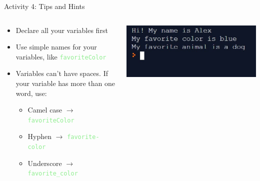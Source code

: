 \documentclass[hyperref={pdfpagemode=FullScreen},aspectratio=169]{beamer}
\begin{document}
  \begin{frame}{Activity 4: Tips and Hints}

    \begin{columns}[c]
      \begin{column}{0.48\textwidth}
        {\small \begin{itemize}
          \item Declare all your variables first
          \item Use simple names for your variables, like \textcolor{lightGreen}{\texttt{favoriteColor}}
          \item Variables can't have spaces. If your variable has more than one word, use:
        
            \begin{itemize}
              \item Camel case $\rightarrow$ \textcolor{lightGreen}{\texttt{favoriteColor}}
              \item Hyphen $\rightarrow$ \textcolor{lightGreen}{\texttt{favorite-color}} 
              \item Underscore $\rightarrow$ \textcolor{lightGreen}{\texttt{favorite\_color}}
            \end{itemize}
        \end{itemize} }
      \end{column}

      \hfill

      \begin{column}{0.48\textwidth}
        \begin{center}
          \includegraphics[scale=0.55]{imgs/activityFourConsoleOutput.JPG}
        \end{center}
      \end{column}

    \end{columns}

  \end{frame}
\end{document}
